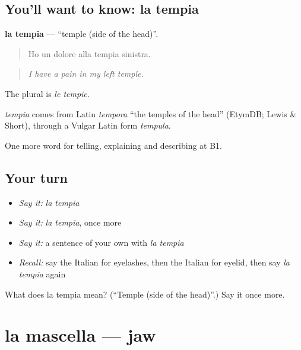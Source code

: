 \subsection*{You'll want to know: la tempia}
\textbf{la tempia} — \textquotedblleft{}temple (side of the head)\textquotedblright{}.

\begin{quote}
Ho un dolore alla tempia sinistra.
\end{quote}

\begin{quote}
\emph{I have a pain in my left temple.}
\end{quote}

The plural is \emph{le tempie}.

\begin{cousinweb}
\emph{tempia} comes from Latin \emph{tempora} \textquotedblleft{}the temples of the head\textquotedblright{} (EtymDB; Lewis \& Short), through a Vulgar Latin form \emph{tempula}.
\end{cousinweb}

\begin{grammarlens}[title={What you've built}]
One more word for telling, explaining and describing at B1.
\end{grammarlens}

\subsection*{Your turn}
\begin{itemize}
\raggedright
  \item \emph{Say it:} \emph{la tempia}
  \item \emph{Say it:} \emph{la tempia}, once more
  \item \emph{Say it:} a sentence of your own with \emph{la tempia}
  \item \emph{Recall:} say the Italian for eyelashes, then the Italian for eyelid, then say \emph{la tempia} again
\end{itemize}

\begin{tcolorbox}[breakable,colback=teal!4,colframe=teal!35!black,title={Before you move on}]
What does la tempia mean? (\textquotedblleft{}Temple (side of the head)\textquotedblright{}.) Say it once more.
\end{tcolorbox}
\section[la mascella]{la mascella — jaw}


